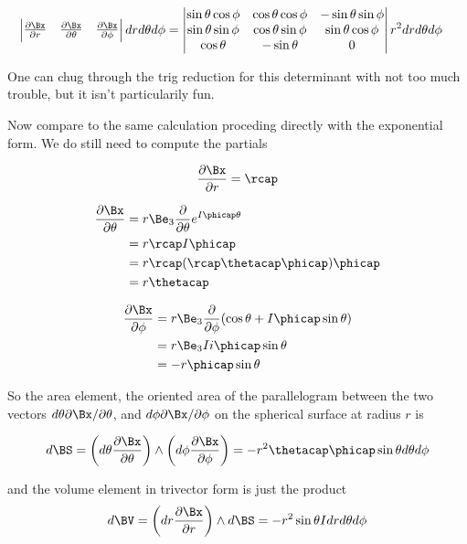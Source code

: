 \begin{align}\label{eqn:sphericalPolarUnit:foo4}
\begin{vmatrix}
\frac{\partial \Bx}{\partial r} & \frac{\partial \Bx}{\partial \theta} & \frac{\partial \Bx}{\partial \phi} \\
\end{vmatrix} dr d\theta d\phi
&=
\begin{vmatrix}
\sin\theta \cos\phi & \cos\theta \cos\phi & -\sin\theta \sin\phi \\
\sin\theta \sin\phi & \cos\theta \sin\phi & \sin\theta \cos\phi \\
\cos\theta          & -\sin\theta         & 0                   \\
\end{vmatrix} r^2 dr d\theta d\phi
\end{align}

One can chug through the trig reduction for this determinant with not too much trouble, but it isn't particularily fun.

Now compare to the same calculation proceding directly with the exponential form.  We do still need to compute the partials

\begin{align*}
\frac{\partial \Bx}{\partial r} = \rcap
\end{align*}

\begin{align*}
\frac{\partial \Bx}{\partial \theta} 
&= r \Be_3 \frac{\partial }{\partial \theta} e^{I\phicap \theta} \\
&= r \rcap I \phicap \\
&= r \rcap (\rcap \thetacap \phicap) \phicap \\
&= r \thetacap
\end{align*}

\begin{align*}
\frac{\partial \Bx}{\partial \phi} 
&= r \Be_3 \frac{\partial }{\partial \phi} (\cos\theta + I\phicap \sin\theta) \\
&= r \Be_3 I i \phicap \sin\theta \\
&= -r \phicap \sin\theta 
\end{align*}

So the area element, the oriented area of the parallelogram between the two vectors $d\theta \partial \Bx/\partial \theta$, and $d\phi \partial \Bx/\partial \phi$ on the spherical surface at radius $r$ is

\begin{align}\label{eqn:sphericalPolarUnit:foo5}
d\BS = \left(d\theta \frac{\partial \Bx}{\partial \theta}\right) \wedge \left( d\phi \frac{\partial \Bx}{\partial \phi} \right) 
= -r^2 \thetacap \phicap \sin\theta d\theta d\phi
\end{align}

and the volume element in trivector form is just the product
\begin{align}\label{eqn:sphericalPolarUnit:foo6}
d\BV = \left(dr\frac{\partial \Bx}{\partial r}\right) \wedge d\BS
= -r^2 \sin\theta I dr d\theta d\phi
\end{align}

\EndArticle
